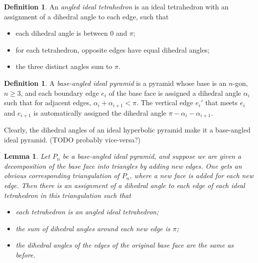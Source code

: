 \documentclass[11pt]{amsart}
\theoremstyle{plain}
\newtheorem{lemma}[theorem]{Lemma}
\theoremstyle{definition}
\newtheorem{define}[theorem]{Definition}
\begin{document}
\begin{define}
An \emph{angled ideal tetrahedron} is an ideal tetrahedron with an assignment of a dihedral angle
to each edge, such that
\begin{itemize}
\item each dihedral angle is between 0 and $\pi$;
\item for each tetrahedron, opposite edges have equal dihedral angles;
\item the three distinct angles sum to $\pi$.
\end{itemize}
\end{define}


\begin{define}
A \emph{base-angled ideal pyramid}
is a pyramid whose base is an $n$-gon, $n \geq 3$,
and each boundary edge $e_i$ of the base face is assigned a dihedral angle $\alpha_i$
such that for adjacent edges, $\alpha_i + \alpha_{i+1} < \pi$.
The vertical edge $e_i'$ that meets $e_i$ and $e_{i+1}$
is automatically assigned the dihedral angle $\pi - \alpha_i - \alpha_{i+1}$.
\end{define}

Clearly, the dihedral angles of an ideal hyperbolic pyramid
make it a base-angled ideal pyramid.
(TODO probably vice-versa?)

\begin{lemma}
Let $P_n$ be a base-angled ideal pyramid,
and suppose we are given a decomposition of the base face into triangles by adding new edges. 
One gets an obvious corresponding triangulation of $P_n$, where a new face is added for each new edge. Then there is an assignment of a dihedral angle to each edge of each ideal tetrahedron in this triangulation such that
\begin{itemize}
\item each tetrahedron is an angled ideal tetrahedron;
\item the sum of dihedral angles around each new edge is $\pi$;
\item the dihedral angles of the edges of the original base face are the same as before.
\end{itemize} 
\end{lemma}
\end{document}
